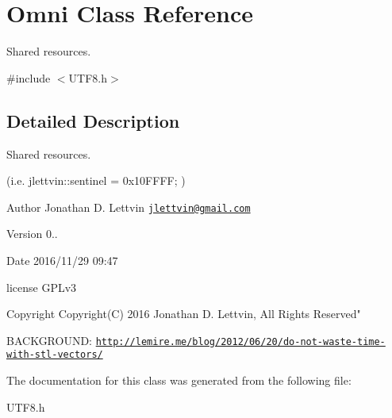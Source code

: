 \hypertarget{class_omni}{}\section{Omni Class Reference}
\label{class_omni}


Shared resources.  




{\ttfamily \#include $<$U\+T\+F8.\+h$>$}



\subsection{Detailed Description}
Shared resources. 

(i.\+e. jlettvin\+::sentinel = 0x10\+F\+F\+F\+F; )

\begin{DoxyAuthor}{Author}
Jonathan D. Lettvin \href{mailto:jlettvin@gmail.com}{\tt jlettvin@gmail.\+com}
\end{DoxyAuthor}
\begin{DoxyVersion}{Version}
0..
\end{DoxyVersion}
\begin{DoxyDate}{Date}
2016/11/29 09\+:47
\end{DoxyDate}
license G\+P\+Lv3

\begin{DoxyCopyright}{Copyright}
Copyright(\+C) 2016 Jonathan D. Lettvin, All Rights Reserved"
\end{DoxyCopyright}
B\+A\+C\+K\+G\+R\+O\+U\+N\+D\+: \href{http://lemire.me/blog/2012/06/20/do-not-waste-time-with-stl-vectors/}{\tt http\+://lemire.\+me/blog/2012/06/20/do-\/not-\/waste-\/time-\/with-\/stl-\/vectors/} 

The documentation for this class was generated from the following file\+:\begin{DoxyCompactItemize}
\item 
U\+T\+F8.\+h\end{DoxyCompactItemize}
